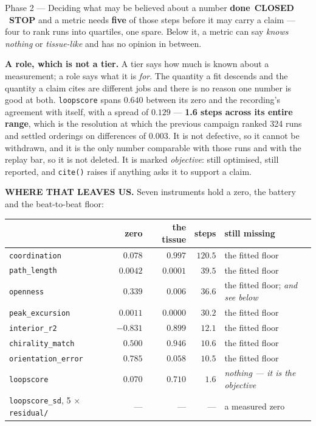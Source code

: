 \documentclass[11pt,a4paper]{article}
\newcommand{\code}[1]{\texttt{#1}}
\newcommand{\dn}{\textcolor{good}{\textbf{done}}}
\newcommand{\stopp}{\textcolor{bad!30!white}{\textbf{STOP}}}
\begin{document}
\begin{phasebox}{Phase 2 --- Deciding what may be believed about a number \hfill \dn\ \textbf{CLOSED} \ \stopp}
\noindent and a metric needs \textbf{five} of those steps before it may carry a claim --- four to
rank runs into quartiles, one spare. Below it, a metric can say \emph{knows nothing} or
\emph{tissue-like} and has no opinion in between.

\textbf{A role, which is not a tier.} A tier says how much is known about a measurement; a role says
what it is \emph{for}. The quantity a fit descends and the quantity a claim cites are different jobs
and there is no reason one number is good at both. \code{loopscore} spans $0.640$ between its zero
and the recording's agreement with itself, with a spread of $0.129$ --- \textbf{1.6 steps across its
entire range}, which is the resolution at which the previous campaign ranked 324 runs and settled
orderings on differences of $0.003$. It is not defective, so it cannot be withdrawn, and it is the
only number comparable with those runs and with the replay bar, so it is not deleted. It is marked
\emph{objective}: still optimised, still reported, and \code{cite()} raises if anything asks it to
support a claim.

\medskip
\textbf{WHERE THAT LEAVES US.} Seven instruments hold a zero, the battery and the beat-to-beat
floor:

\begin{center}\small
\begin{tabular}{@{}l r r r l@{}}
\toprule
& \textbf{zero} & \textbf{the tissue} & \textbf{steps} & \textbf{still missing}\\
\midrule
\code{coordination} & $0.078$ & $0.997$ & $120.5$ & the fitted floor\\
\code{path\_length} & $0.0042$ & $0.0001$ & $39.5$ & the fitted floor\\
\code{openness} & $0.339$ & $0.006$ & $36.6$ & the fitted floor; \emph{and see below}\\
\code{peak\_excursion} & $0.0011$ & $0.0000$ & $30.2$ & the fitted floor\\
\code{interior\_r2} & $-0.831$ & $0.899$ & $12.1$ & the fitted floor\\
\code{chirality\_match} & $0.500$ & $0.946$ & $10.6$ & the fitted floor\\
\code{orientation\_error} & $0.785$ & $0.058$ & $10.5$ & the fitted floor\\
\midrule
\code{loopscore} & $0.070$ & $0.710$ & $1.6$ & \emph{nothing --- it is the objective}\\
\code{loopscore\_sd}, 5 $\times$ \code{residual/} & --- & --- & --- & a measured zero\\
\bottomrule
\end{tabular}
\end{center}


\end{phasebox}
\end{document}
